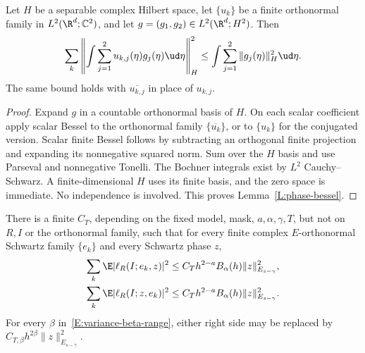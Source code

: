 \begin{lemma}\label{L:phase-bessel}
  Let $H$ be a separable complex Hilbert space, let $\{u_k\}$ be a finite
  orthonormal family in $L^2(\R^d;\mathbb C^2)$, and let
  $g=(g_1,g_2) \in L^2(\R^d;H^2)$. Then
  \begin{equation}\label{E:phase-bessel}
    \sum_k\left\|\int\sum_{j=1}^2u_{k,j}(\eta)g_j(\eta)\ud\eta\right\|_H^2
    \le \int\sum_{j=1}^2\|g_j(\eta)\|_H^2\ud\eta.
  \end{equation}
  The same bound holds with $\overline{u_{k,j}}$ in place of $u_{k,j}$.
\end{lemma}

\begin{proof}
  Expand $g$ in a countable orthonormal basis of $H$. On each scalar
  coefficient apply scalar Bessel to the orthonormal family
  $\{\overline{u_k}\}$, or to $\{u_k\}$ for the conjugated version.
  Scalar finite Bessel follows by subtracting an orthogonal finite
  projection and expanding its nonnegative squared norm. Sum over the
  $H$ basis and use Parseval and nonnegative Tonelli. The Bochner integrals
  exist by $L^2$ Cauchy--Schwarz. A finite-dimensional $H$ uses its finite
  basis, and the zero space is immediate. No independence is involved.
  This proves Lemma~\ref{L:phase-bessel}.
\end{proof}

\begin{proposition}\label{P:wave-two-variances}
  There is a finite $C_T$, depending on the fixed model, mask,
  $a,\alpha,\gamma,T$, but not on $R,I$ or the orthonormal family, such
  that for every finite complex $E$-orthonormal Schwartz family $\{e_k\}$
  and every Schwartz phase $z$,
  \begin{align}
    \sum_k\E|\ell_R(I;e_k,z)|^2
    &\le C_T h^{2-a}B_\alpha(h)\|z\|_{E_{s-\gamma}}^2,
    \label{E:wave-input-variance}\\
    \sum_k\E|\ell_R(I;z,e_k)|^2
    &\le C_T h^{2-a}B_\alpha(h)\|z\|_{E_{s-\gamma}}^2.
    \label{E:wave-output-variance}
  \end{align}
  For every $\beta$ in~\eqref{E:variance-beta-range}, either right side
  may be replaced by $C_{T,\beta}h^{2\beta}\|z\|_{E_{s-\gamma}}^2$.
\end{proposition}

